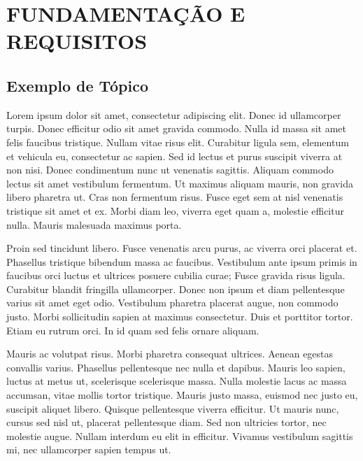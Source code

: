 \chapter{FUNDAMENTAÇÃO E REQUISITOS}

\section{Exemplo de Tópico}

Lorem ipsum dolor sit amet, consectetur adipiscing elit. Donec id ullamcorper turpis. Donec efficitur odio sit amet gravida commodo. Nulla id massa sit amet felis faucibus tristique. Nullam vitae risus elit. Curabitur ligula sem, elementum et vehicula eu, consectetur ac sapien. Sed id lectus et purus suscipit viverra at non nisi. Donec condimentum nunc ut venenatis sagittis. Aliquam commodo lectus sit amet vestibulum fermentum. Ut maximus aliquam mauris, non gravida libero pharetra ut. Cras non fermentum risus. Fusce eget sem at nisl venenatis tristique sit amet et ex. Morbi diam leo, viverra eget quam a, molestie efficitur nulla. Mauris malesuada maximus porta.

Proin sed tincidunt libero. Fusce venenatis arcu purus, ac viverra orci placerat et. Phasellus tristique bibendum massa ac faucibus. Vestibulum ante ipsum primis in faucibus orci luctus et ultrices posuere cubilia curae; Fusce gravida risus ligula. Curabitur blandit fringilla ullamcorper. Donec non ipsum et diam pellentesque varius sit amet eget odio. Vestibulum pharetra placerat augue, non commodo justo. Morbi sollicitudin sapien at maximus consectetur. Duis et porttitor tortor. Etiam eu rutrum orci. In id quam sed felis ornare aliquam.

Mauris ac volutpat risus. Morbi pharetra consequat ultrices. Aenean egestas convallis varius. Phasellus pellentesque nec nulla et dapibus. Mauris leo sapien, luctus at metus ut, scelerisque scelerisque massa. Nulla molestie lacus ac massa accumsan, vitae mollis tortor tristique. Mauris justo massa, euismod nec justo eu, suscipit aliquet libero. Quisque pellentesque viverra efficitur. Ut mauris nunc, cursus sed nisl ut, placerat pellentesque diam. Sed non ultricies tortor, nec molestie augue. Nullam interdum eu elit in efficitur. Vivamus vestibulum sagittis mi, nec ullamcorper sapien tempus ut.
